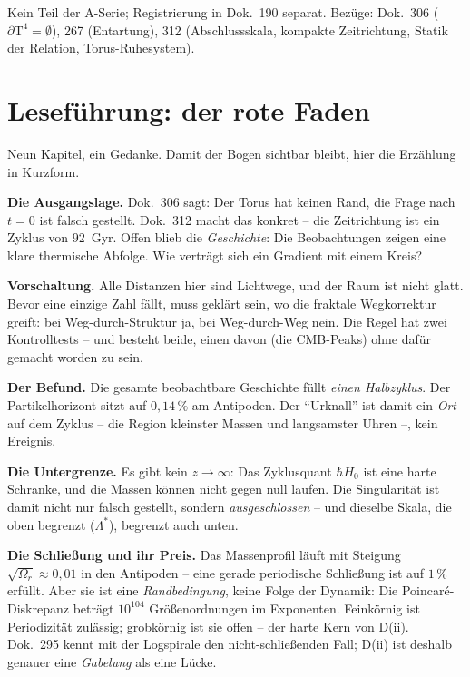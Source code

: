 \documentclass[11pt]{report}
\begin{document}
Kein Teil der A-Serie; Registrierung in Dok.~190 separat. Bezüge:
Dok.~306 ($\partial\text{T}^4 = \emptyset$), 267 (Entartung),
312 (Abschlussskala, kompakte Zeitrichtung, Statik der Relation,
Torus-Ruhesystem).

\section*{Leseführung: der rote Faden}

Neun Kapitel, ein Gedanke. Damit der Bogen sichtbar bleibt, hier
die Erzählung in Kurzform.

\textbf{Die Ausgangslage.} Dok.~306 sagt: Der Torus hat keinen
Rand, die Frage nach $t=0$ ist falsch gestellt. Dok.~312 macht das
konkret -- die Zeitrichtung ist ein Zyklus von $92$~Gyr. Offen
blieb die \emph{Geschichte}: Die Beobachtungen zeigen eine klare
thermische Abfolge. Wie verträgt sich ein Gradient mit einem
Kreis?

\textbf{Vorschaltung.} Alle Distanzen hier sind Lichtwege, und der
Raum ist nicht glatt. Bevor eine einzige Zahl fällt, muss geklärt
sein, wo die fraktale Wegkorrektur greift: bei Weg-durch-Struktur
ja, bei Weg-durch-Weg nein. Die Regel hat zwei Kontrolltests --
und besteht beide, einen davon (die CMB-Peaks) ohne dafür gemacht
worden zu sein.

\textbf{Der Befund.} Die gesamte beobachtbare Geschichte füllt
\emph{einen Halbzyklus}. Der Partikelhorizont sitzt auf
$0{,}14\,\%$ am Antipoden. Der \enquote{Urknall} ist damit ein
\emph{Ort} auf dem Zyklus -- die Region kleinster Massen und
langsamster Uhren --, kein Ereignis.

\textbf{Die Untergrenze.} Es gibt kein $z \to \infty$: Das
Zyklusquant $\hbar H_0$ ist eine harte Schranke, und die Massen
können nicht gegen null laufen. Die Singularität ist damit nicht
nur falsch gestellt, sondern \emph{ausgeschlossen} -- und
dieselbe Skala, die oben begrenzt ($\Lambda^{*}$), begrenzt auch
unten.

\textbf{Die Schließung und ihr Preis.} Das Massenprofil läuft mit
Steigung $\sqrt{\Omega_r} \approx 0{,}01$ in den Antipoden -- eine
gerade periodische Schließung ist auf $1\,\%$ erfüllt. Aber sie
ist eine \emph{Randbedingung}, keine Folge der Dynamik: Die
Poincaré-Diskrepanz beträgt $10^{104}$ Größenordnungen im
Exponenten. Feinkörnig ist Periodizität zulässig; grobkörnig ist
sie offen -- der harte Kern von D(ii). Dok.~295 kennt mit der
Logspirale den nicht-schließenden Fall; D(ii) ist deshalb genauer
eine \emph{Gabelung} als eine Lücke.
\end{document}
